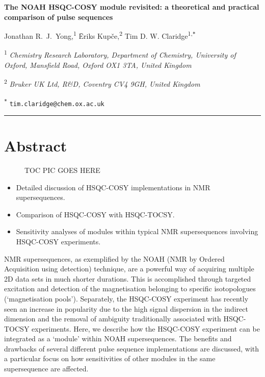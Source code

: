 \documentclass[a4paper,12pt]{article}
\newcommand{\me}{Jonathan R.\ J.\ Yong}
\newcommand{\eriks}{{\=E}riks Kup{\v{c}}e}
\newcommand{\tim}{Tim D. W. Claridge}
\newcommand{\articletitle}{The NOAH HSQC-COSY module revisited: a theoretical and practical comparison of pulse sequences}
\newcommand{\crl}{Chemistry Research Laboratory, Department of Chemistry, University of Oxford, Mansfield Road, Oxford OX1 3TA, United Kingdom}
\newcommand{\turing}{The Alan Turing Institute, The British Library, 96 Euston Road, London NW1 2DB, United Kingdom}
\newcommand{\brukeruk}{Bruker UK Ltd, R\&D, Coventry CV4 9GH, United Kingdom}
\newcommand{\exscientia}{Exscientia Ltd, The Schr{\"o}dinger Building, Oxford Science Park, Oxford OX4 4GE, United Kingdom}
\newcommand{\proton}{\ch{^{1}H}}
\newcommand{\todo}[1]{{\color{OrangeRed}#1}}
\begin{document}
 \begin{refsection}

\begin{center}   %
    \textbf{\Large \articletitle{}}

    \vspace{0.2cm}

    \me{},\textsuperscript{1} \eriks{},\textsuperscript{2} \tim\textsuperscript{1,\texttt{*}}

    \vspace{0.2cm}

    \small

    \textsuperscript{1} \textit{\crl{}}


    \textsuperscript{2} \textit{\brukeruk{}}


    \normalsize \textsuperscript{\texttt{*}} \texttt{tim.claridge@chem.ox.ac.uk}

    \vspace{0.5cm} \hrule

\end{center}

\section*{Abstract}
\begin{figure}[ht]
    \todo{TOC PIC GOES HERE}
\end{figure}

\begin{itemize}
    \item Detailed discussion of HSQC-COSY implementations in NMR supersequences.
    \item Comparison of HSQC-COSY with HSQC-TOCSY.
    \item Sensitivity analyses of modules within typical NMR supersequences involving HSQC-COSY experiments.
\end{itemize}

NMR supersequences, as exemplified by the NOAH (NMR by Ordered Acquisition using \proton{} detection) technique, are a powerful way of acquiring multiple 2D data sets in much shorter durations.
This is accomplished through targeted excitation and detection of the magnetisation belonging to specific isotopologues (`magnetisation pools').
Separately, the HSQC-COSY experiment has recently seen an increase in popularity due to the high signal dispersion in the indirect dimension and the removal of ambiguity traditionally associated with HSQC-TOCSY experiments.
Here, we describe how the HSQC-COSY experiment can be integrated as a `module' within NOAH supersequences.
The benefits and drawbacks of several different pulse sequence implementations are discussed, with a particular focus on how sensitivities of other modules in the same supersequence are affected.


\end{refsection}
\end{document}
